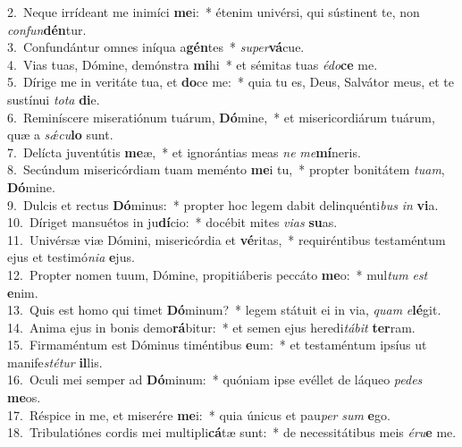 {2.~}Neque irrídeant me inimíci \textbf{me}i:~* étenim univérsi, qui sústinent te, non \textit{con}\textit{fun}\textbf{dén}tur.\\
{3.~}Confundántur omnes iníqua a\textbf{gén}tes~* \textit{su}\textit{per}\textbf{vá}cue.\\
{4.~}Vias tuas, Dómine, demónstra \textbf{mi}hi~* et sémitas tuas \textit{é}\textit{do}\textbf{ce} me.\\
{5.~}Dírige me in veritáte tua, et \textbf{do}ce me:~* quia tu es, Deus, Salvátor meus, et te sustínui \textit{to}\textit{ta} \textbf{di}e.\\
{6.~}Reminíscere miseratiónum tuárum, \textbf{Dó}mine,~* et misericordiárum tuárum, quæ a \textit{sǽ}\textit{cu}\textbf{lo} sunt.\\
{7.~}Delícta juventútis \textbf{me}æ,~* et ignorántias meas \textit{ne} \textit{me}\textbf{mí}neris.\\
{8.~}Secúndum misericórdiam tuam meménto \textbf{me}i tu,~* propter bonitátem \textit{tu}\textit{am}, \textbf{Dó}mine.\\
{9.~}Dulcis et rectus \textbf{Dó}minus:~* propter hoc legem dabit delinquénti\textit{bus} \textit{in} \textbf{vi}a.\\
{10.~}Díriget mansuétos in ju\textbf{dí}cio:~* docébit mites \textit{vi}\textit{as} \textbf{su}as.\\
{11.~}Univérsæ viæ Dómini, misericórdia et \textbf{vé}ritas,~* requiréntibus testaméntum ejus et testimó\textit{ni}\textit{a} \textbf{e}jus.\\
{12.~}Propter nomen tuum, Dómine, propitiáberis peccáto \textbf{me}o:~* mul\textit{tum} \textit{est} \textbf{e}nim.\\
{13.~}Quis est homo qui timet \textbf{Dó}minum?~* legem státuit ei in via, \textit{quam} \textit{e}\textbf{lé}git.\\
{14.~}Anima ejus in bonis demo\textbf{rá}bitur:~* et semen ejus heredi\textit{tá}\textit{bit} \textbf{ter}ram.\\
{15.~}Firmaméntum est Dóminus timéntibus \textbf{e}um:~* et testaméntum ipsíus ut manife\textit{sté}\textit{tur} \textbf{il}lis.\\
{16.~}Oculi mei semper ad \textbf{Dó}minum:~* quóniam ipse evéllet de láqueo \textit{pe}\textit{des} \textbf{me}os.\\
{17.~}Réspice in me, et miserére \textbf{me}i:~* quia únicus et pau\textit{per} \textit{sum} \textbf{e}go.\\
{18.~}Tribulatiónes cordis mei multipli\textbf{cá}tæ sunt:~* de necessitátibus meis \textit{é}\textit{ru}\textbf{e} me.\\
